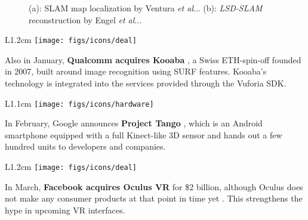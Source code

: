 \documentclass[12pt,a4paper]{article}
\makeatletter
\DeclareRobustCommand\onedot{\futurelet\@let@token\@onedot}
\def\@onedot{\ifx\@let@token.\else.\null\fi\xspace}
\def\etal{\emph{et al}\onedot}
\makeatother
\begin{document}
\vspace{0.1in}

\begin{figure}[tbp]
\centering
\vspace{-5pt}
 \hfill 
{}
\vspace{-10pt}
\caption{ (a): SLAM map localization by Ventura \etal \cite{Ventura14}. (b): \emph{LSD-SLAM} reconstruction by Engel \etal \cite{engel14eccv}.}
\vspace{-10pt}
\label{fig:seventeen}
\end{figure}

\begin{wrapfigure}{L}{1.2cm}
	\vspace{-0pt}	
	\texttt{[image: figs/icons/deal]}
	\vspace{-20pt}		
\end{wrapfigure} 
\noindent Also in January, \textbf{Qualcomm acquires Kooaba} , a Swiss ETH-spin-off founded in 2007, built around image recognition using SURF features. Kooaba's technology is integrated into the services provided through the Vuforia SDK.

\vspace{0.1in}

\begin{wrapfigure}{L}{1.1cm}
	\vspace{-10pt}	
	\texttt{[image: figs/icons/hardware]}
	\vspace{-10pt}		
\end{wrapfigure} 
\noindent In February, Google announces \textbf{Project Tango} , which is an Android smartphone equipped with a full Kinect-like 3D sensor and hands out a few hundred units to developers and companies.

\vspace{0.1in}

\begin{wrapfigure}{L}{1.2cm}
	\vspace{-10pt}	
	\texttt{[image: figs/icons/deal]}
	\vspace{-20pt}		
\end{wrapfigure} 
\noindent In March, \textbf{Facebook acquires Oculus VR} for \$2 billion, although Oculus does not make any consumer products at that point in time yet . This strengthens the hype in upcoming VR interfaces.
\end{document}
